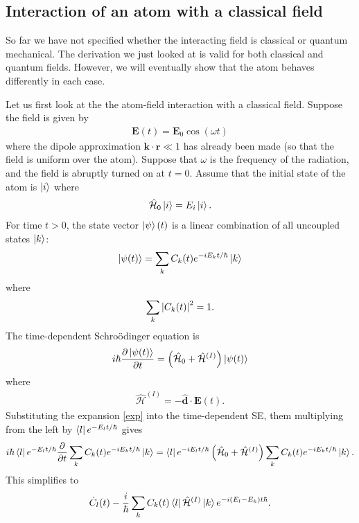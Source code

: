\documentclass{book}
\theoremstyle{definition}
\newcommand{\p}{\partial}
\newcommand{\ham}{\mathcal{H}}
\newcommand{\f}[2]{\frac{#1}{#2}}
\newcommand{\lp}{\left(}
\newcommand{\rp}{\right)}
\begin{document}
\subsection{Interaction of an atom with a classical field}

So far we have not specified whether the interacting field is classical or quantum mechanical. The derivation we just looked at is valid for both classical and quantum fields. However, we will eventually show that the atom behaves differently in each case. 

Let us first look at the the atom-field interaction with a classical field. Suppose the field is given by
\begin{align}
\mathbf{E}(t) = \mathbf{E}_0 \cos(\omega t)
\end{align}
where the dipole approximation $\mathbf{k}\cdot\mathbf{r} \ll 1$ has already been made (so that the field is uniform over the atom). Suppose that $\omega$ is the frequency of the radiation, and the field is abruptly turned on at $t = 0$. Assume that the initial state of the atom is $\ket{i}$ where
\begin{align}
\hat{\ham}_0 \ket{i} = E_i\ket{i}. 
\end{align}
For time $t > 0$, the state vector $\ket{\psi}(t)$ is a linear combination of all uncoupled states $\ket{k}$:
\begin{align}\label{exp}
\ket{\psi(t)} = \sum_k C_k(t) e^{-iE_k t/\hbar}\ket{k}
\end{align}
where
\begin{align}
\sum_k \abs{C_k(t)}^2= 1.
\end{align}
The time-dependent Schro\"{o}dinger equation is
\begin{align}
i\hbar \f{\p \ket{\psi(t)}}{\p t} = \lp \hat{\ham}_0 + \hat{\ham}^{(I)} \rp\ket{\psi(t)}
\end{align}
where
\begin{align}
\hat{\ham}^{(I)} = -\hat{\mathbf{d}}\cdot\mathbf{E}(t).
\end{align}
Substituting the expansion \eqref{exp} into the time-dependent SE, them multiplying from the left by $\bra{l}e^{-E_l t/\hbar}$ gives
\begin{align}
i\hbar \bra{l}e^{-E_l t/\hbar} \f{\p}{\p t}\sum_k C_k(t) e^{-iE_k t/\hbar}\ket{k} = \bra{l}e^{-i E_l t/\hbar} \lp \hat{\ham}_0 + \hat{\ham}^{(I)} \rp \sum_k C_k(t) e^{-iE_k t/\hbar}\ket{k}.
\end{align}
This simplifies to 
\begin{align}
\dot{C}_l(t) - \f{i}{\hbar}\sum_k C_k(t)\bra{l}\hat{\ham}^{(I)}\ket{k} e^{-i (E_l - E_k)t\hbar}.
\end{align}
\end{document}
